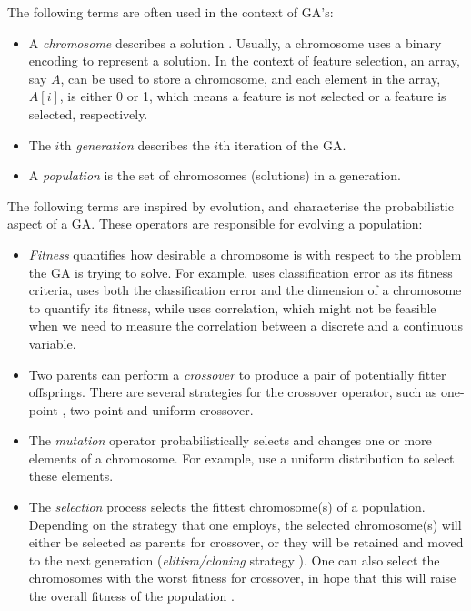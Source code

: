 \documentclass[12pt, twoside, a4paper]{report}
\begin{document}
The following terms are often used in the context of GA's:
\begin{itemize}
  \item A \textit{chromosome} describes a solution \cite{RefWorks:205, RefWorks:209}. Usually, a chromosome uses a binary encoding to represent a solution. In the context of feature selection, an array, say $A$, can be used to store a chromosome, and each element in the array, $A[i]$, is either 0 or 1, which means a feature is not selected or a feature is selected, respectively.
  
  \item The $i$th \textit{generation} describes the $i$th iteration of the GA.
  
  \item A \textit{population} is the set of chromosomes (solutions) in a generation.
\end{itemize}

The following terms are inspired by evolution, and characterise the probabilistic aspect of a GA. These operators are responsible for evolving a population:
\begin{itemize}
  \item \textit{Fitness} quantifies how desirable a chromosome is with respect to the problem the GA is trying to solve. For example, \cite{RefWorks:204} uses classification error as its fitness criteria, \cite{RefWorks:200} uses both the classification error and the dimension of a chromosome to quantify its fitness, while \cite{RefWorks:201} uses correlation, which might not be feasible when we need to measure the correlation between a discrete and a continuous variable.
  
  \item Two parents can perform a \textit{crossover} to produce a pair of potentially fitter offsprings. There are several strategies for the crossover operator, such as one-point \cite{RefWorks:201}, two-point \cite{RefWorks:202, RefWorks:204} and uniform crossover.
  
  \item The \textit{mutation} operator probabilistically selects and changes one or more elements of a chromosome. For example, \cite{RefWorks:201, RefWorks:204} use a uniform distribution to select these elements.

  \item The \textit{selection} process selects the fittest chromosome(s) of a population. Depending on the strategy that one employs, the selected chromosome(s) will either be selected as parents for crossover, or they will be retained and moved to the next generation (\textit{elitism/cloning}  strategy \cite{RefWorks:202}). One can also select the chromosomes with the worst fitness for crossover, in hope that this will raise the overall fitness of the population \cite{RefWorks:203}.
  
\end{itemize}
\end{document}
